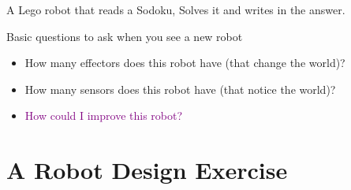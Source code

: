 \documentclass[color=pdftex,usenames,dvipsnames, aspectratio=169]{beamer}
\begin{document}

\begin{frame}[fragile]{A Lego robot that reads a Sodoku, Solves it and writes in the answer.}
\begin{center}
\href{https://www.youtube.com/watch?v=coKi3SRw_Dk}{}
\end{center}

\begin{block}{Basic questions to ask when you see a new robot}
\begin{itemize}
\item \textcolor{OliveGreen}{How many effectors} does this robot have (that change the world)?
\item \textcolor{RedOrange}{How many sensors} does this robot have (that notice the world)?
\item \textcolor{purple}{How could I improve this robot?}
\end{itemize}
\end{block}
\end{frame}

\section{A Robot Design Exercise}
\end{document}
